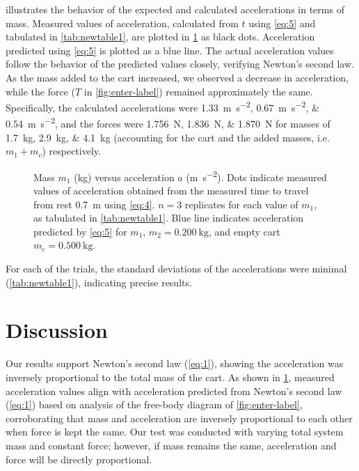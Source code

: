 \documentclass[reprint,amsmath,amssymb,aps]{revtex4-2}
\begin{document}
 illustrates the behavior of the expected and calculated accelerations in terms of mass. Measured values of acceleration, calculated from $t$ using \cref{eq:5} and tabulated in \ref{tab:newtable1}, are plotted in \cref{fig:graph of acceleration} as black dots. Acceleration predicted using \cref{eq:5} is plotted as a blue line. The actual acceleration values follow the behavior of the predicted values closely, verifying Newton's second law. As the mass added to the cart increased, we observed a decrease in acceleration, while the force ($T$ in \cref{fig:enter-label}) remained approximately the same. Specifically, the calculated accelerations were \qtylist{1.33;0.67;0.54}{\meter\per\second\squared}, and the forces were \qtylist{1.756;1.836;1.870}{\newton} for masses of \qtylist{1.7;2.9;4.1}{\kilo\gram} (accounting for the cart and the added masses, i.e. $m_1+m_c$) respectively. 

\begin{figure}[ht] %
\begin{center}

\end{center}
\caption{\label{fig:graph of acceleration} Mass $m_1$ (\unit{\kilo\gram}) versus acceleration $a$ (\unit{\meter\per\second\squared}). Dots indicate measured values of acceleration obtained from the measured time to travel from rest \qty{0.7}{\meter} using \cref{eq:4}. $n=3$ replicates for each value of $m_1$, as tabulated in \cref{tab:newtable1}. Blue line indicates acceleration predicted by \cref{eq:5} for $m_1$, $m_2=\qty{0.200}{\kilo\gram}$, and empty cart $m_c=\qty{0.500}{\kilo\gram}$.}
\end{figure}

For each of the trials, the standard deviations of the accelerations were minimal (\cref{tab:newtable1}), indicating precise results. 





\section{Discussion}
Our results support Newton's second law (\cref{eq:1}), showing the acceleration was inversely proportional to the total mass of the cart. As shown in \cref{fig:graph of acceleration}, measured acceleration values align with acceleration predicted from Newton's second law (\cref{eq:1}) based on analysis of the free-body diagram of \cref{fig:enter-label}, corroborating that mass and acceleration are inversely proportional to each other when force is kept the same. Our test was conducted with varying total system mass and constant force; however, if mass remains the same, acceleration and force will be directly proportional. 
\end{document}
